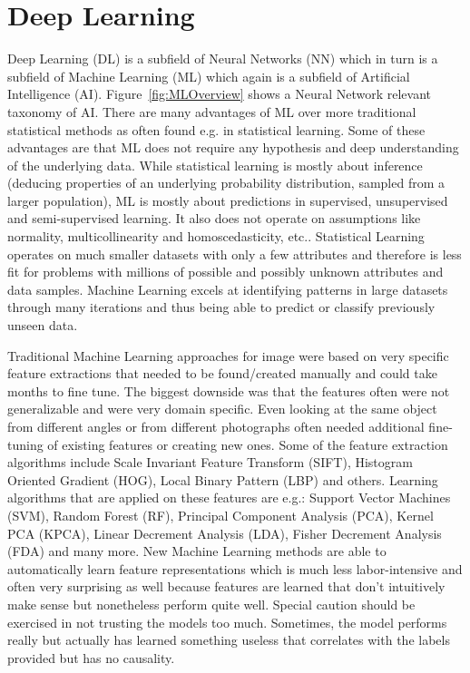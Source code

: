 \chapter{Deep Learning}

Deep Learning (DL) is a subfield of Neural Networks (NN) which in turn is a subfield of Machine Learning (ML) which again is a subfield of Artificial Intelligence (AI). Figure~\ref{fig:MLOverview} shows a Neural Network relevant taxonomy of AI. There are many advantages of ML over more traditional statistical methods as often found e.g. in statistical learning. Some of these advantages are that ML does not require any hypothesis and deep understanding of the underlying data. While statistical learning is mostly about inference (deducing properties of an underlying probability distribution, sampled from a larger population), ML is mostly about predictions in supervised, unsupervised and semi-supervised learning. It also does not operate on assumptions like normality, multicollinearity and homoscedasticity, etc.. Statistical Learning operates on much smaller datasets with only a few attributes and therefore is less fit for problems with millions of possible and possibly unknown attributes and data samples. Machine Learning excels at identifying patterns in large datasets through many iterations and thus being able to predict or classify previously unseen data.

Traditional Machine Learning approaches for image were based on very specific feature extractions that needed to be found/created manually and could take months to fine tune. The biggest downside was that the features often were not generalizable and were very domain specific. Even looking at the same object from different angles or from different photographs often needed additional fine-tuning of existing features or creating new ones. Some of the feature extraction algorithms include Scale Invariant Feature Transform (SIFT), Histogram Oriented Gradient (HOG), Local Binary Pattern (LBP) and others. Learning algorithms that are applied on these features are e.g.: Support Vector Machines (SVM), Random Forest (RF), Principal Component Analysis (PCA), Kernel PCA (KPCA), Linear Decrement Analysis (LDA), Fisher Decrement Analysis (FDA) and many more. New Machine Learning methods are able to automatically learn feature representations which is much less labor-intensive and often very surprising as well because features are learned that don't intuitively make sense but nonetheless perform quite well. Special caution should be exercised in not trusting the models too much. Sometimes, the model performs really but actually has learned something useless that correlates with the labels provided but has no causality.\\


